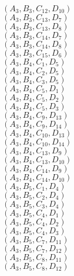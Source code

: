 \documentclass[14pt]{article}
\begin{document}
    $({A}_{3}, {B}_{3}, {C}_{12}, {D}_{10}) $ \\ 
    $({A}_{3}, {B}_{3}, {C}_{13}, {D}_{7}) $ \\ 
    $({A}_{3}, {B}_{3}, {C}_{13}, {D}_{8}) $ \\ 
    $({A}_{3}, {B}_{3}, {C}_{14}, {D}_{7}) $ \\ 
    $({A}_{3}, {B}_{3}, {C}_{14}, {D}_{8}) $ \\ 
    $({A}_{3}, {B}_{3}, {C}_{15}, {D}_{6}) $ \\ 
    $({A}_{3}, {B}_{4}, {C}_{1}, {D}_{5}) $ \\ 
    $({A}_{3}, {B}_{4}, {C}_{2}, {D}_{5}) $ \\ 
    $({A}_{3}, {B}_{4}, {C}_{3}, {D}_{5}) $ \\ 
    $({A}_{3}, {B}_{4}, {C}_{5}, {D}_{1}) $ \\ 
    $({A}_{3}, {B}_{4}, {C}_{5}, {D}_{2}) $ \\ 
    $({A}_{3}, {B}_{4}, {C}_{5}, {D}_{3}) $ \\ 
    $({A}_{3}, {B}_{4}, {C}_{9}, {D}_{13}) $ \\ 
    $({A}_{3}, {B}_{4}, {C}_{9}, {D}_{14}) $ \\ 
    $({A}_{3}, {B}_{4}, {C}_{10}, {D}_{13}) $ \\ 
    $({A}_{3}, {B}_{4}, {C}_{10}, {D}_{14}) $ \\ 
    $({A}_{3}, {B}_{4}, {C}_{13}, {D}_{9}) $ \\ 
    $({A}_{3}, {B}_{4}, {C}_{13}, {D}_{10}) $ \\ 
    $({A}_{3}, {B}_{4}, {C}_{14}, {D}_{9}) $ \\ 
    $({A}_{3}, {B}_{4}, {C}_{14}, {D}_{10}) $ \\ 
    $({A}_{3}, {B}_{5}, {C}_{1}, {D}_{4}) $ \\ 
    $({A}_{3}, {B}_{5}, {C}_{2}, {D}_{4}) $ \\ 
    $({A}_{3}, {B}_{5}, {C}_{3}, {D}_{4}) $ \\ 
    $({A}_{3}, {B}_{5}, {C}_{4}, {D}_{1}) $ \\ 
    $({A}_{3}, {B}_{5}, {C}_{4}, {D}_{2}) $ \\ 
    $({A}_{3}, {B}_{5}, {C}_{4}, {D}_{3}) $ \\ 
    $({A}_{3}, {B}_{5}, {C}_{7}, {D}_{11}) $ \\ 
    $({A}_{3}, {B}_{5}, {C}_{7}, {D}_{12}) $ \\ 
    $({A}_{3}, {B}_{5}, {C}_{8}, {D}_{11}) $ \\ 
    $({A}_{3}, {B}_{5}, {C}_{8}, {D}_{12}) $ \\ 
\end{document}

